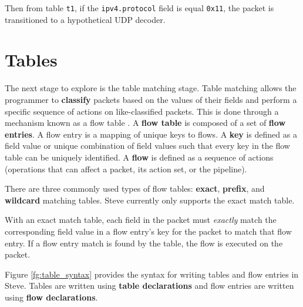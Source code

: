 Then from table \texttt{t1}, if the \texttt{ipv4.protocol} field is equal \texttt{0x11}, the packet is transitioned to a hypothetical UDP decoder.

\section{Tables} \label{table_tut}

The next stage to explore is the table matching stage. Table matching allows the programmer to \textbf{classify} packets based on the values of their fields and perform a specific sequence of actions on like-classified packets. This is done through a mechanism known as a flow table \cite{openflow_spec}. A \textbf{flow table} is composed of a set of \textbf{flow entries}. A flow entry is a mapping of unique keys to flows. A \textbf{key} is defined as a field value or unique combination of field values such that every key in the flow table can be uniquely identified. A \textbf{flow} is defined as a sequence of actions (operations that can affect a packet, its action set, or the pipeline).

There are three commonly used types of flow tables: \textbf{exact}, \textbf{prefix}, and \textbf{wildcard} matching tables. Steve currently only supports the exact match table. 

With an exact match table, each field in the packet must \textit{exactly} match the corresponding field value in a flow entry's key for the packet to match that flow entry. If a flow entry match is found by the table, the flow is executed on the packet.

Figure \ref{fg:table_syntax} provides the syntax for writing tables and flow entries in Steve. Tables are written using \textbf{table declarations} and flow entries are written using \textbf{flow declarations}.

